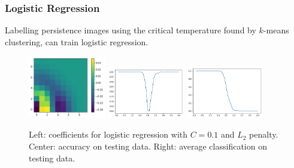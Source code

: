 \documentclass[11pt]{article}
\begin{document}
\subsubsection{Logistic Regression}
Labelling persistence images using the critical temperature found by $k$-means clustering, can train logistic regression.

\begin{figure}[h]
    \centering
    \includegraphics[width=0.3\textwidth]{squareice_images/logreg_2d_squareice}
    \includegraphics[width=0.3\textwidth]{squareice_images/logreg_acc_2d_squareice}
    \includegraphics[width=0.3\textwidth]{squareice_images/logreg_avg_2d_squareice}
    \caption{Left: coefficients for logistic regression with $C=0.1$ and $L_2$ penalty. Center: accuracy on testing data. Right: average classification on testing data.}
    \label{fig:SquareiceLogReg}
\end{figure}
\end{document}
